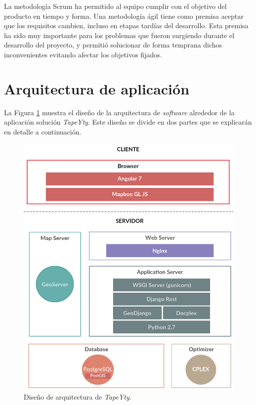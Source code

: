 La metodología Scrum ha permitido al equipo cumplir con el objetivo del producto en tiempo y forma. Una metodología ágil tiene como premisa aceptar que los requisitos cambien, incluso en etapas tardías del desarrollo. Esta premisa ha sido muy importante para los problemas que fueron surgiendo durante el desarrollo del proyecto, y permitió solucionar de forma temprana dichos inconvenientes evitando afectar los objetivos fijados.


\section{Arquitectura de aplicación}

La Figura \ref{fig:disenhoArquitectura} muestra el diseño de la arquitectura de \textit{software} alrededor de la aplicación solución \textit{TapeYty}. Este diseño se divide en dos partes que se explicarán en detalle a continuación.

\begin{figure}[bp]
\centerline{\includegraphics[width=\textwidth]{20190424_WebAppArchitectureDesign.png}}
\caption{Diseño de arquitectura de \textit{TapeYty}.}
\label{fig:disenhoArquitectura}
\end{figure}

